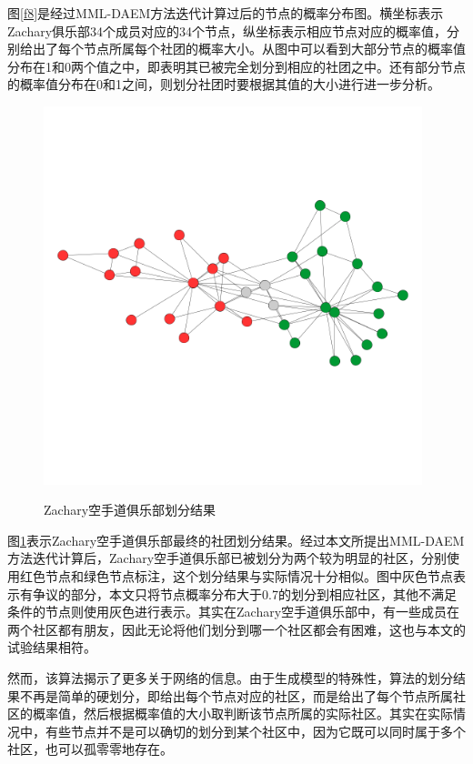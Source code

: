 \documentclass[a4paper,12pt,openany,oneside,utf-8]{ctexbook}
\begin{document}
	图\ref{f8}是经过MML-DAEM方法迭代计算过后的节点的概率分布图。横坐标表示Zachary俱乐部34个成员对应的34个节点，纵坐标表示相应节点对应的概率值，分别给出了每个节点所属每个社团的概率大小。从图中可以看到大部分节点的概率值分布在1和0两个值之中，即表明其已被完全划分到相应的社团之中。还有部分节点的概率值分布在0和1之间，则划分社团时要根据其值的大小进行进一步分析。
	
	\begin{figure}[H]
	\centering
	\includegraphics[width=110mm,height=110mm]{figure/karate.png}\\
	\caption{Zachary空手道俱乐部划分结果}\label{f9}
    \end{figure}
    
    图\ref{f9}表示Zachary空手道俱乐部最终的社团划分结果。经过本文所提出MML-DAEM方法迭代计算后，Zachary空手道俱乐部已被划分为两个较为明显的社区，分别使用红色节点和绿色节点标注，这个划分结果与实际情况十分相似。图中灰色节点表示有争议的部分，本文只将节点概率分布大于0.7的划分到相应社区，其他不满足条件的节点则使用灰色进行表示。其实在Zachary空手道俱乐部中，有一些成员在两个社区都有朋友，因此无论将他们划分到哪一个社区都会有困难，这也与本文的试验结果相符。
    
    然而，该算法揭示了更多关于网络的信息。由于生成模型的特殊性，算法的划分结果不再是简单的硬划分，即给出每个节点对应的社区，而是给出了每个节点所属社区的概率值，然后根据概率值的大小取判断该节点所属的实际社区。其实在实际情况中，有些节点并不是可以确切的划分到某个社区中，因为它既可以同时属于多个社区，也可以孤零零地存在。
    
\end{document}
